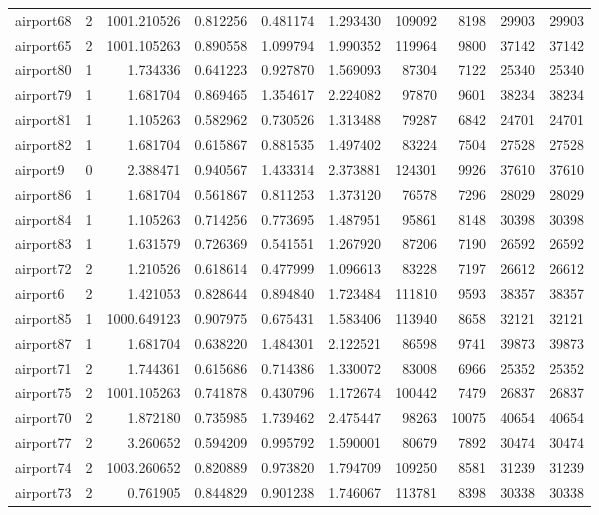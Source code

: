 \documentclass[../../../thesis.tex]{subfiles}
\begin{document}
\begin{longtable}{|l|r|r|r|r|r|r|r|r|r|}
airport68 & 2 & 1001.210526 & 0.812256 & 0.481174 & 1.293430 & 109092 & 8198 & 29903 & 29903 \\
airport65 & 2 & 1001.105263 & 0.890558 & 1.099794 & 1.990352 & 119964 & 9800 & 37142 & 37142 \\
airport80 & 1 & 1.734336 & 0.641223 & 0.927870 & 1.569093 & 87304 & 7122 & 25340 & 25340 \\
airport79 & 1 & 1.681704 & 0.869465 & 1.354617 & 2.224082 & 97870 & 9601 & 38234 & 38234 \\
airport81 & 1 & 1.105263 & 0.582962 & 0.730526 & 1.313488 & 79287 & 6842 & 24701 & 24701 \\
airport82 & 1 & 1.681704 & 0.615867 & 0.881535 & 1.497402 & 83224 & 7504 & 27528 & 27528 \\
airport9 & 0 & 2.388471 & 0.940567 & 1.433314 & 2.373881 & 124301 & 9926 & 37610 & 37610 \\
airport86 & 1 & 1.681704 & 0.561867 & 0.811253 & 1.373120 & 76578 & 7296 & 28029 & 28029 \\
airport84 & 1 & 1.105263 & 0.714256 & 0.773695 & 1.487951 & 95861 & 8148 & 30398 & 30398 \\
airport83 & 1 & 1.631579 & 0.726369 & 0.541551 & 1.267920 & 87206 & 7190 & 26592 & 26592 \\
airport72 & 2 & 1.210526 & 0.618614 & 0.477999 & 1.096613 & 83228 & 7197 & 26612 & 26612 \\
airport6 & 2 & 1.421053 & 0.828644 & 0.894840 & 1.723484 & 111810 & 9593 & 38357 & 38357 \\
airport85 & 1 & 1000.649123 & 0.907975 & 0.675431 & 1.583406 & 113940 & 8658 & 32121 & 32121 \\
airport87 & 1 & 1.681704 & 0.638220 & 1.484301 & 2.122521 & 86598 & 9741 & 39873 & 39873 \\
airport71 & 2 & 1.744361 & 0.615686 & 0.714386 & 1.330072 & 83008 & 6966 & 25352 & 25352 \\
airport75 & 2 & 1001.105263 & 0.741878 & 0.430796 & 1.172674 & 100442 & 7479 & 26837 & 26837 \\
airport70 & 2 & 1.872180 & 0.735985 & 1.739462 & 2.475447 & 98263 & 10075 & 40654 & 40654 \\
airport77 & 2 & 3.260652 & 0.594209 & 0.995792 & 1.590001 & 80679 & 7892 & 30474 & 30474 \\
airport74 & 2 & 1003.260652 & 0.820889 & 0.973820 & 1.794709 & 109250 & 8581 & 31239 & 31239 \\
airport73 & 2 & 0.761905 & 0.844829 & 0.901238 & 1.746067 & 113781 & 8398 & 30338 & 30338 \\

\end{longtable}
\end{document}
